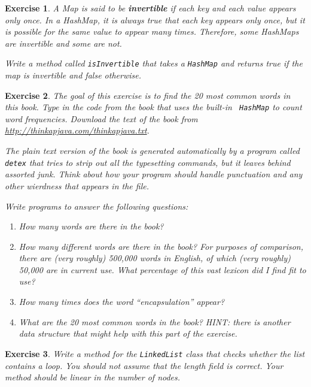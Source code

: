 \documentclass[12pt]{book}
\theoremstyle{exercise}
\newtheorem{exercise}{Exercise}[chapter]
\begin{document}
\begin{exercise}
A Map is said to be {\bf invertible} if each key and each value
appears only once.  In a HashMap, it is always true that each
key appears only once, but it is possible for the same value to
appear many times.  Therefore, some HashMaps are invertible
and some are not.

Write a method called {\tt isInvertible} that takes a {\tt HashMap}
and returns true if the map is invertible and false otherwise.
\end{exercise}


\begin{exercise}

The goal of this exercise is to find the 20 most common words in this
book.  Type in the code from the book that uses the built-in {\tt
HashMap} to count word frequencies.  Download the text of the book
from \url{http://thinkapjava.com/thinkapjava.txt}.

The plain text version of the book is generated automatically by a
program called {\tt detex} that tries to strip out all the typesetting
commands, but it leaves behind assorted junk.  Think about how your
program should handle punctuation and any other wierdness that appears
in the file.

Write programs to answer the following questions:

\begin{enumerate}

\item How many words are there in the book?

\item How many {\em different} words are there in the book?  For
purposes of comparison, there are (very roughly) 500,000 words in
English, of which (very roughly) 50,000 are in current use.  What
percentage of this vast lexicon did I find fit to use?

\item How many times does the word ``encapsulation'' appear?

\item What are the 20 most common words in the book?  HINT: there is
another data structure that might help with this part of the exercise.

\end{enumerate}
\end{exercise}


\begin{exercise}
Write a method for the {\tt LinkedList} class that checks whether
the list contains a loop.  You should not assume that the length
field is correct.
Your method should be linear in the
number of nodes.
\end{exercise}
\end{document}
